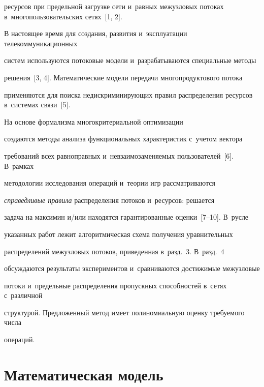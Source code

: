 ресурсов при предельной загрузке сети  и~равных межузловых потоках в~многопользовательских сетях~[1, 2].





В настоящее время для создания, развития и~эксплуатации  телекоммуникационных 


систем   используются  потоковые  модели и~разрабатываются  специальные методы 


решения~[3, 4]. Математические  модели передачи многопродуктового потока  


применяются для поиска недискриминирующих правил распределения ресурсов в~сис\-те\-мах связи~[5]. 


 На  основе   формализма  многокритериальной оптимизации 


создаются  методы  анализа функциональных характеристик  с~учетом  вектора  


требований  всех равноправных и~невзаимозаменяемых пользователей~[6]. В~рамках 


методологии исследования операций и~тео\-рии игр рассматриваются 


\textit{справедливые правила}  распределения потоков и~ресурсов:  решается 


задача на максимин и\!/\!или находятся  гарантированные оценки~[7--10]. В~русле 


указанных работ лежит алгоритмическая схема  получения уравнительных 


распределений  межузловых потоков,  приведенная в~разд.~3. В~разд.~4  


обсуждаются результаты  экспериментов  и~сравниваются  достижимые  межузловые  


потоки  и~предельные  распределения пропускных способностей  в~сетях с~различной 


структурой. Предложенный метод имеет  полиномиальную оценку  требуемого чис\-ла 


операций. 





\vspace*{-6pt}





\section{Математическая модель}





